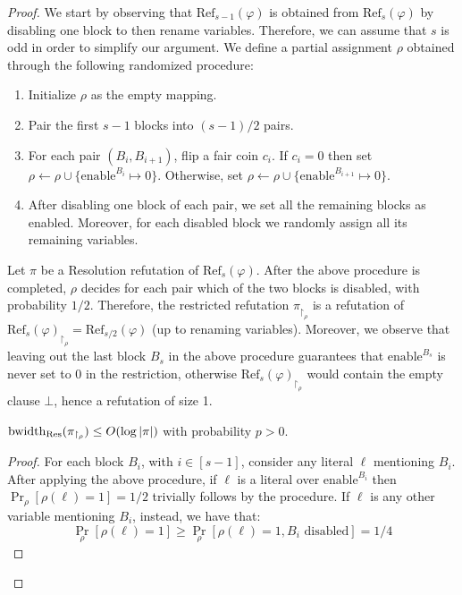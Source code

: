 \begin{proof}
    We start by observing that $\mathrm{Ref}_{s-1}(\varphi)$ is obtained from $\mathrm{Ref}_{s}(\varphi)$ by disabling one block to then rename variables. Therefore, we can assume that $s$ is odd in order to simplify our argument. We define a partial assignment $\rho$ obtained through the following randomized procedure:
    \begin{enumerate}[nosep]
        \item Initialize $\rho$ as the empty mapping.
        \item Pair the first $s-1$ blocks into $(s-1)/2$ pairs.
        \item For each pair $(B_i, B_{i+1})$, flip a fair coin $c_i$. If $c_i = 0$ then set $\rho \gets \rho \cup \{\mathrm{enable}^{B_i} \mapsto 0\}$. Otherwise, set $\rho \gets \rho \cup \{\mathrm{enable}^{B_{i+1}} \mapsto 0\}$.
        \item After disabling one block of each pair, we set all the remaining blocks as enabled. Moreover, for each disabled block we randomly assign all its remaining variables.
    \end{enumerate}

    Let $\pi$ be a Resolution refutation of $\mathrm{Ref}_s(\varphi)$. After the above procedure is completed, $\rho$ decides for each pair which of the two blocks is disabled, with probability $1/2$. Therefore, the restricted refutation $\pi_{\upharpoonright_{\rho}}$ is a refutation of $\mathrm{Ref}_{s}(\varphi)_{\upharpoonright_\rho} = \mathrm{Ref}_{s/2}(\varphi)$ (up to renaming variables). Moreover, we observe that leaving out the last block $B_s$ in the above procedure guarantees that $\mathrm{enable}^{B_s}$ is never set to 0 in the restriction, otherwise $\mathrm{Ref}_{s}(\varphi)_{\upharpoonright_\rho}$ would contain the empty clause $\bot$, hence a refutation of size 1.

    \begin{claim}
        $\mathrm{bwidth}_{\mathrm{Res}}(\pi_{\upharpoonright_{\rho}}) \leq O(\log \left|\pi\right|)$ with probability $p > 0$.
    \end{claim}

    \begin{proof}
        For each block $B_i$, with $i \in [s-1]$, consider any literal $\ell$ mentioning $B_i$. After applying the above procedure, if $\ell$ is a literal over $\mathrm{enable}^{B_i}$ then $\Pr_{\rho}[\rho(\ell) = 1] = 1/2$ trivially follows by the procedure. If $\ell$ is any other variable mentioning $B_i$, instead, we have that:
        \[\Pr_{\rho}[\rho(\ell) = 1] \geq \Pr_{\rho}[\rho(\ell) = 1, B_i \text{ disabled}] = 1/4\]


\end{proof}
\end{proof}
